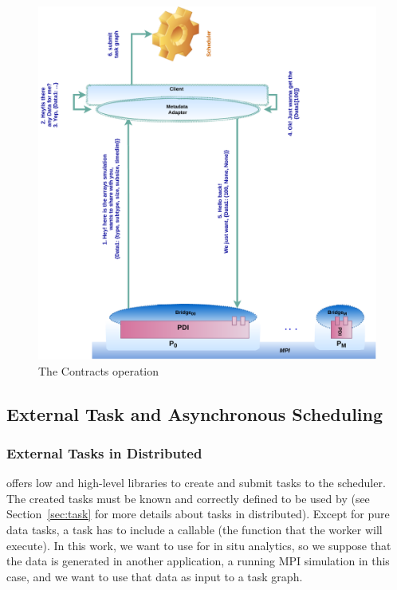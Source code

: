 \begin{figure}\centering
\includegraphics[scale=0.65,  angle=-90]{figures/Contracts .pdf}
\caption{The Contracts operation}
\label{figcontracts}
\end{figure}



\subsection{External Task and Asynchronous Scheduling}
\subsubsection{External Tasks in \dask Distributed}\label{sec:externaltasks}

\dask offers low and high-level libraries to create and submit tasks to the scheduler. The created tasks must be known and correctly defined to be used by \dask (see Section~\ref{sec:task} for more details about tasks in \dask distributed). Except for pure data tasks, a task has to include a callable (the function that the worker will execute). In this work, we want to use \dask for in situ analytics, so we suppose that the data is generated in another application, a running MPI simulation in this case, and we want to use that data as input to a \dask task graph. 

